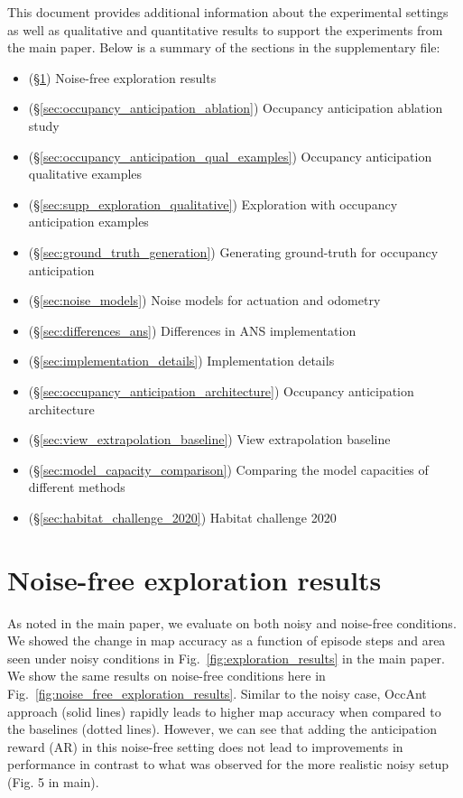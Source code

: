 \documentclass[runningheads]{llncs}
\begin{document}
This document provides additional information about the experimental settings as well as qualitative and quantitative results to support the experiments from the main paper. Below is a summary of the sections in the supplementary file:
\begin{itemize}
    \item (\S\ref{sec:supp_noise_free}) Noise-free exploration results
    \item (\S\ref{sec:occupancy_anticipation_ablation}) Occupancy anticipation ablation study
    \item (\S\ref{sec:occupancy_anticipation_qual_examples}) Occupancy anticipation qualitative examples
    \item (\S\ref{sec:supp_exploration_qualitative}) Exploration with occupancy anticipation examples
    \item (\S\ref{sec:ground_truth_generation}) Generating ground-truth for occupancy anticipation
    \item (\S\ref{sec:noise_models}) Noise models for actuation and odometry
    \item (\S\ref{sec:differences_ans}) Differences in ANS implementation
    \item (\S\ref{sec:implementation_details}) Implementation details
    \item (\S\ref{sec:occupancy_anticipation_architecture}) Occupancy anticipation architecture
    \item (\S\ref{sec:view_extrapolation_baseline}) View extrapolation baseline
    \item (\S\ref{sec:model_capacity_comparison}) Comparing the model capacities of different methods
    \item (\S\ref{sec:habitat_challenge_2020}) Habitat challenge 2020
\end{itemize}


\section{Noise-free exploration results}
\label{sec:supp_noise_free}
As noted in the main paper, we evaluate on both noisy and noise-free conditions.  We showed the change in map accuracy as a function of episode steps and area seen under noisy conditions in Fig.~\ref{fig:exploration_results} in the main paper. We show the same results on noise-free conditions here in Fig.~\ref{fig:noise_free_exploration_results}. Similar to the noisy case, OccAnt approach (solid lines) rapidly leads to higher map accuracy when compared to the baselines (dotted lines). However, we can see that adding the anticipation reward (AR) in this noise-free setting does not lead to improvements in performance in contrast to what was observed for the more realistic noisy setup (Fig. 5 in main). 
\end{document}
